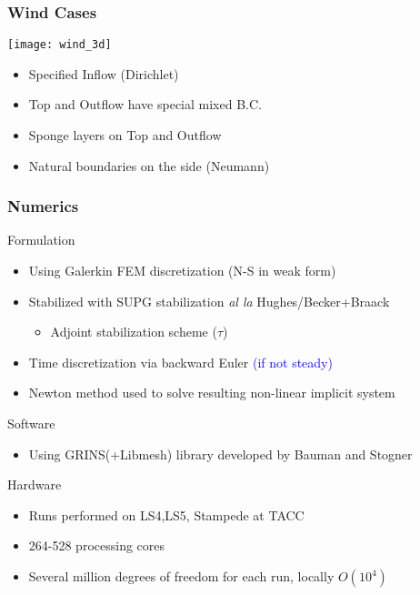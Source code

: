 \documentclass[mathserif]{beamer}
\begin{document}
%
%
%
\begin{frame}
\frametitle{Wind Cases}

\begin{block}

   \begin{center}
    \texttt{[image: wind\_3d]}
   \end{center}

   \begin{itemize}
   \item Specified Inflow (Dirichlet)
   \item Top and Outflow have special mixed B.C.
   \item Sponge layers on Top and Outflow
   \item Natural boundaries on the side (Neumann)
   \end{itemize}

\end{block}
\end{frame}


%
%
%
\begin{frame}
  \frametitle{Numerics}
  \begin{block}{Formulation}
    \begin{itemize}
    \item Using Galerkin FEM discretization (N-S in weak form)
    \item Stabilized with SUPG stabilization \textit{al la} Hughes/Becker+Braack
      \begin{itemize}
      \item Adjoint stabilization scheme ($\tau$)
      \end{itemize}
    \item Time discretization via backward Euler \textcolor{blue}{(if not steady)}
    \item Newton method used to solve resulting non-linear implicit system
    \end{itemize}
  \end{block}

  \begin{block}{Software}
    \begin{itemize}
    \item Using GRINS(+Libmesh) library developed by Bauman and Stogner
    \end{itemize}
  \end{block}

  \begin{block}{Hardware}
    \begin{itemize}
    \item Runs performed on LS4,LS5, Stampede at TACC
    \item 264-528 processing cores
    \item Several million degrees of freedom for each run, locally $O(10^4)$ 
    \end{itemize}
  \end{block}

\end{frame}
\end{document}
